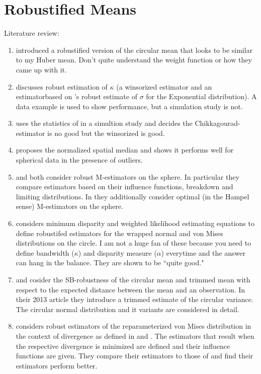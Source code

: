 \documentclass{article}\usepackage{graphicx, color}
\begin{document}
\section{Robustified Means}

Literature review:
\begin{enumerate}
\item \cite{lenth1981} introduced a robustified version of the circular mean that looks to be similar to my Huber mean.  Don't quite understand the weight function or how they came up with it.
\item \cite{fisher1982} discusses robust estimation of $\kappa$ (a winsorized estimator and an estimatorbased on \cite{chikkagoudar1980}'s robust estimate of $\sigma$ for the Exponential distribution).  A data example is used to show performance, but a simulation study is not.

\item \cite{kimber1985} uses the statistics of \cite{fisher1982} in a simultion study and decides the Chikkagourad-estimator is no good but the winsorized is good.

\item \cite{ducharme1987} proposes the normalized spatial median and shows it performs well for spherical data in the presence of outliers.

\item \cite{he1992} and \cite{ko1993} both consider robust M-estimators on the sphere.  In particular they compare estimators based on their influence functions, breakdown and limiting distributions.  In \cite{ko1993} they additionally consider optimal (in the Hampel sense) M-estimators on the sphere.

\item \cite{agostinelli2007} considers minimum disparity and weighted likelihood estimating equations to define robustifed estimators for the wrapped normal and von Mises distributions on the circle.  I am not a huge fan of these because you need to define bandwidth ($\kappa$) and disparity measure ($\alpha$) everytime and the answer can hang in the balance.  They are shown to be ``quite good."

\item \cite{laha2011} and \cite{laha2013} cosider the SB-robustness of the circular mean and trimmed mean with respect to the expected distance between the mean and an observation.  In their 2013 article they introduce a trimmed estimate of the circular variance.  The circular normal distribution and it variants are considered in detail.

\item \cite{kato2012} considers robust estimators of the reparameterized von Mises distribution in the context of divergence as defined in \cite{basu1998} and \cite{jones2001}.  The estimators that result when the respective divergence is minimized are defined and their influence functions are given.  They compare their estimators to those of \cite{lenth1981} and find their estimators perform better.
\end{enumerate}
\end{document}
